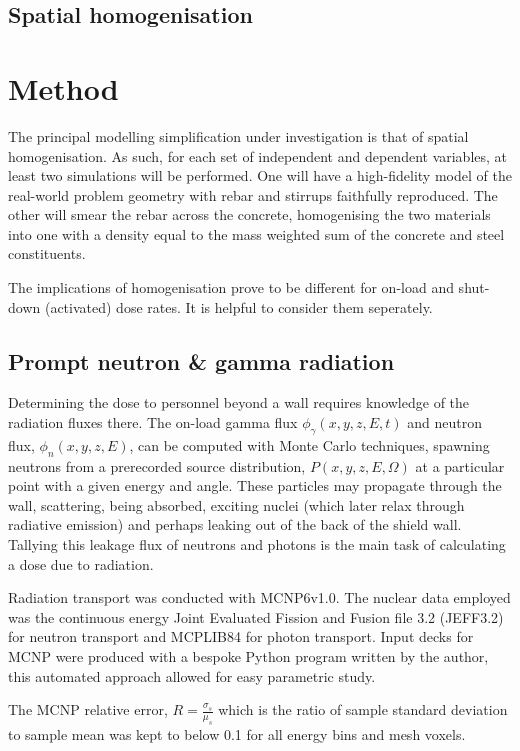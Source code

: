 \subsection{Spatial homogenisation}

\section{Method}

The principal modelling simplification under investigation is that of spatial homogenisation. As such, for each set of independent and dependent variables, at least two simulations will be performed. One will have a high-fidelity model of the real-world problem geometry with rebar and stirrups faithfully reproduced. The other will smear the rebar across the concrete, homogenising the two materials into one with a density equal to the mass weighted sum of the concrete and steel constituents. \par
The implications of homogenisation prove to be different for on-load and shut-down (activated) dose rates. It is helpful to consider them seperately.

\subsection{Prompt neutron \& gamma radiation}

Determining the dose to personnel beyond a wall requires knowledge of the radiation fluxes there. The on-load gamma flux $\phi_{\gamma}(x,y,z,E,t)$ and neutron flux, $\phi_{n}(x,y,z,E)$, can be computed with Monte Carlo techniques, spawning neutrons from a prerecorded source distribution, $P(x,y,z,E,\Omega)$ at a particular point with a given energy and angle. These particles may propagate through the wall, scattering, being absorbed, exciting nuclei (which later relax through radiative emission) and perhaps leaking out of the back of the shield wall. Tallying this leakage flux of neutrons and photons is the main task of calculating a dose due to radiation.\par
Radiation transport was conducted with MCNP6v1.0. The nuclear data employed was the continuous energy Joint Evaluated Fission and Fusion file 3.2 (JEFF3.2) for neutron transport and MCPLIB84 for photon transport. Input decks for MCNP were produced with a bespoke Python program written by the author, this automated approach allowed for easy parametric study. \par
The MCNP relative error, $R = \frac{\sigma_{s}}{\mu_{s}}$ which is the ratio of sample standard deviation to sample mean was kept to below 0.1 for all energy bins and mesh voxels.

